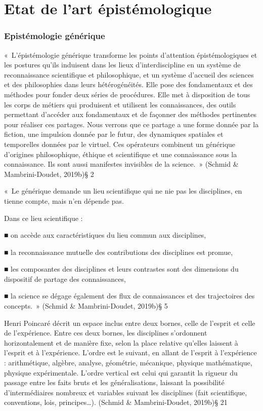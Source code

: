 \documentclass[
  letterpaper,
  DIV=11,
  numbers=noendperiod]{scrreprt}
\begin{document}

\hypertarget{sec-etatArtEpistemo}{%
\chapter{Etat de l'art épistémologique}\label{sec-etatArtEpistemo}}

\hypertarget{epistuxe9mologie-guxe9nuxe9rique}{%
\subsection{Epistémologie
générique}\label{epistuxe9mologie-guxe9nuxe9rique}}

«~L'épistémologie générique transforme les points d'attention
épistémologiques et les postures qu'ils induisent dans les lieux
d'interdiscipline en un système de reconnaissance scientifique et
philosophique, et un système d'accueil des sciences et des philosophies
dans leurs hétérogénéités. Elle pose des fondamentaux et des méthodes
pour fonder deux séries de procédures. Elle met à disposition de tous
les corps de métiers qui produisent et utilisent les connaissances, des
outils permettant d'accéder aux fondamentaux et de façonner des méthodes
pertinentes pour réaliser ces partages. Nous verrons que ce partage a
une forme donnée par la fiction, une impulsion donnée par le futur, des
dynamiques spatiales et temporelles données par le virtuel. Ces
opérateurs combinent un générique d'origines philosophique, éthique et
scientifique et une connaissance sous la connaissance. Ils sont aussi
manifestes invisibles de la science.~» (Schmid \& Mambrini-Doudet,
2019b)§ 2

«~Le générique demande un lieu scientifique qui ne nie pas les
disciplines, en tienne compte, mais n'en dépende pas.

Dans ce lieu scientifique :

■ on accède aux caractéristiques du lieu commun aux disciplines,

■ la reconnaissance mutuelle des contributions des disciplines est
promue,

■ les composantes des disciplines et leurs contrastes sont des
dimensions du dispositif de partage des connaissances,

■ la science se dégage également des flux de connaissances et des
trajectoires des concepts.~» (Schmid \& Mambrini-Doudet, 2019b)§ 5

Henri Poincaré décrit un espace inclus entre deux bornes, celle de
l'esprit et celle de l'expérience. Entre ces deux bornes, les
disciplines s'ordonnent horizontalement et de manière fixe, selon la
place relative qu'elles laissent à l'esprit et à l'expérience. L'ordre
est le suivant, en allant de l'esprit à l'expérience : arithmétique,
algèbre, analyse, géométrie, mécanique, physique mathématique, physique
expérimentale. L'ordre vertical est celui qui garantit la rigueur du
passage entre les faits bruts et les généralisations, laissant la
possibilité d'intermédiaires nombreux et variables suivant les
disciplines (fait scientifique, conventions, lois, principes\ldots).
(Schmid \& Mambrini-Doudet, 2019b)§ 21
\end{document}
